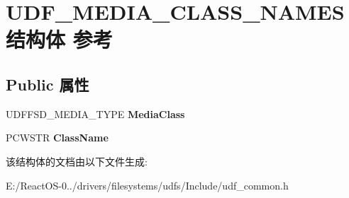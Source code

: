 \hypertarget{struct_u_d_f___m_e_d_i_a___c_l_a_s_s___n_a_m_e_s}{}\section{U\+D\+F\+\_\+\+M\+E\+D\+I\+A\+\_\+\+C\+L\+A\+S\+S\+\_\+\+N\+A\+M\+E\+S结构体 参考}
\label{struct_u_d_f___m_e_d_i_a___c_l_a_s_s___n_a_m_e_s}
\subsection*{Public 属性}
\begin{DoxyCompactItemize}
\item 
\mbox{\label{struct_u_d_f___m_e_d_i_a___c_l_a_s_s___n_a_m_e_s_a7aec8fd81c961f34aeaf63b228a44533}} 
U\+D\+F\+F\+S\+D\+\_\+\+M\+E\+D\+I\+A\+\_\+\+T\+Y\+PE {\bfseries Media\+Class}
\item 
\mbox{\label{struct_u_d_f___m_e_d_i_a___c_l_a_s_s___n_a_m_e_s_af410df1eec4d7926004824c70cea9a55}} 
P\+C\+W\+S\+TR {\bfseries Class\+Name}
\end{DoxyCompactItemize}


该结构体的文档由以下文件生成\+:\begin{DoxyCompactItemize}
\item 
E\+:/\+React\+O\+S-\/0../drivers/filesystems/udfs/\+Include/udf\+\_\+common.\+h\end{DoxyCompactItemize}
